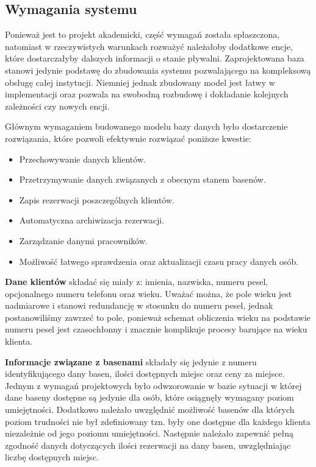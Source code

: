 \documentclass[a4paper]{article}
\begin{document}
\newpage

\subsection{Wymagania systemu} \label{Wymagania}

Ponieważ jest to projekt akademicki, część wymagań została spłaszczona, natomiast w rzeczywistych warunkach rozważyć należałoby dodatkowe encje, które dostarczałyby dalszych informacji o stanie pływalni. Zaprojektowana baza stanowi jedynie podstawę do zbudowania systemu pozwalającego na kompleksową obsługę całej instytucji. Niemniej jednak zbudowany model jest łatwy w implementacji oraz pozwala na swobodną rozbudowę i dokładanie kolejnych zależności czy nowych encji.

Głównym wymaganiem budowanego modelu bazy danych było dostarczenie rozwiązania, które pozwoli efektywnie rozwiązać poniższe kwestie:
\begin{itemize}
    \item Przechowywanie danych klientów.
    \item Przetrzymywanie danych związanych z obecnym stanem basenów.
    \item Zapis rezerwacji poszczególnych klientów.
    \item Automatyczna archiwizacja rezerwacji.
    \item Zarządzanie danymi pracowników.
    \item Możliwość łatwego sprawdzenia oraz aktualizacji czasu pracy danych osób.
\end{itemize}

\textbf{Dane klientów} składać się miały z: imienia, nazwiska, numeru pesel, opcjonalnego numeru telefonu oraz wieku. Uważać można, że pole wieku jest nadmiarowe i stanowi redundancję w stosunku do numeru pesel, jednak postanowiliśmy zawrzeć to pole, ponieważ schemat obliczenia wieku na podstawie numeru pesel jest czasochłonny i znacznie komplikuje procesy bazujące na wieku klienta.

\textbf{Informacje związane z basenami} składały się jedynie z numeru identyfikującego dany basen, ilości dostępnych miejsc oraz ceny za miejsce. Jednym z wymagań projektowych było odwzorowanie w bazie sytuacji w której dane baseny dostępne są jedynie dla osób, które osiągnęły wymagany poziom umiejętności. Dodatkowo należało uwzględnić możliwość basenów dla których poziom trudności nie był zdefiniowany tzn. były one dostępne dla każdego klienta niezależnie od jego poziomu umiejętności. Następnie należało zapewnić pełną zgodność danych dotyczących ilości rezerwacji na dany basen, uwzględniając liczbę dostępnych miejsc.
\end{document}
